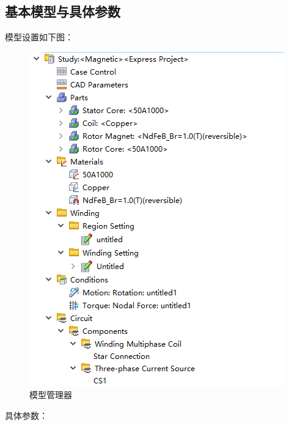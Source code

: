 \documentclass{thuemp}
\begin{document}
\subsection{基本模型与具体参数}
模型设置如下图：
\begin{figure}[H]
  \centering
  \includegraphics[width=1\linewidth]{./img/task1/model1-config1.png}
  \caption{模型管理器}
\end{figure}

具体参数：
\end{document}
